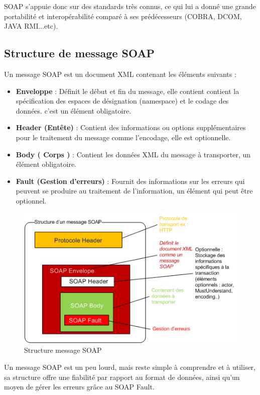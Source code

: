 SOAP s'appuie donc sur des standards très connus, ce qui lui a donné une grande portabilité et interopérabilité comparé à ses prédécesseurs (COBRA, DCOM, JAVA RMI...etc).
				
\subsection{Structure de message SOAP}
Un message SOAP est un document XML contenant les éléments suivants : \cite{refTutorialPointsSOAP}
\begin{itemize}
	\item \textbf{Enveloppe} : Définit le début et fin du message, elle contient contient la spécification des espaces de désignation (namespace) et le codage des données. c'est un élément obligatoire.
	\item \textbf{Header (Entête)} : Contient des informations ou options supplémentaires pour le traitement du message comme l'encodage, elle est optionnelle.
	\item \textbf{Body ( Corps )} : Contient les données XML du message à transporter, un élément obligatoire.
	\item \textbf{Fault (Gestion d'erreurs)} : Fournit des informations sur les erreurs qui peuvent se produire au traitement de l'information, un élément qui peut être optionnel.
\end{itemize}
\begin{figure}[h]
	\begin{center}
		\includegraphics[scale=1]{img/soapmessagebody.png}
	\end{center}	
	\label{Structure message SOAP}
	\caption{Structure message SOAP}		
	\centering
\end{figure}			
Un message SOAP est un peu lourd, mais reste simple à comprendre et à utiliser, sa structure offre une fiabilité par rapport au format de données, ainsi qu'un moyen de gérer les erreurs grâce au SOAP Fault.
\newpage
